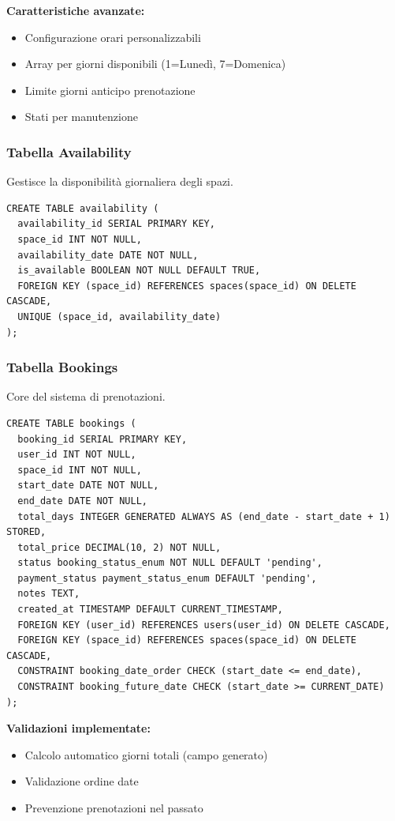 \textbf{Caratteristiche avanzate:}
\begin{itemize}
    \item Configurazione orari personalizzabili
    \item Array per giorni disponibili (1=Lunedì, 7=Domenica)
    \item Limite giorni anticipo prenotazione
    \item Stati per manutenzione
\end{itemize}

\subsubsection{Tabella Availability}
Gestisce la disponibilità giornaliera degli spazi.

\begin{lstlisting}[caption=Struttura Tabella Availability]
CREATE TABLE availability (
  availability_id SERIAL PRIMARY KEY,
  space_id INT NOT NULL,
  availability_date DATE NOT NULL,
  is_available BOOLEAN NOT NULL DEFAULT TRUE,
  FOREIGN KEY (space_id) REFERENCES spaces(space_id) ON DELETE CASCADE,
  UNIQUE (space_id, availability_date)
);
\end{lstlisting}

\subsubsection{Tabella Bookings}
Core del sistema di prenotazioni.

\begin{lstlisting}[caption=Struttura Tabella Bookings]
CREATE TABLE bookings (
  booking_id SERIAL PRIMARY KEY,
  user_id INT NOT NULL,
  space_id INT NOT NULL,
  start_date DATE NOT NULL,
  end_date DATE NOT NULL,
  total_days INTEGER GENERATED ALWAYS AS (end_date - start_date + 1) STORED,
  total_price DECIMAL(10, 2) NOT NULL,
  status booking_status_enum NOT NULL DEFAULT 'pending',
  payment_status payment_status_enum DEFAULT 'pending',
  notes TEXT,
  created_at TIMESTAMP DEFAULT CURRENT_TIMESTAMP,
  FOREIGN KEY (user_id) REFERENCES users(user_id) ON DELETE CASCADE,
  FOREIGN KEY (space_id) REFERENCES spaces(space_id) ON DELETE CASCADE,
  CONSTRAINT booking_date_order CHECK (start_date <= end_date),
  CONSTRAINT booking_future_date CHECK (start_date >= CURRENT_DATE)
);
\end{lstlisting}

\textbf{Validazioni implementate:}
\begin{itemize}
    \item Calcolo automatico giorni totali (campo generato)
    \item Validazione ordine date
    \item Prevenzione prenotazioni nel passato
\end{itemize}

